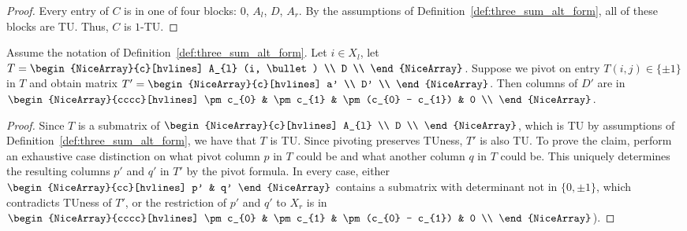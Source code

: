 \begin{proof}
    Every entry of $C$ is in one of four blocks: $0$, $A_{l}$, $D$, $A_{r}$. By the assumptions of Definition~\ref{def:three_sum_alt_form}, all of these blocks are TU. Thus, $C$ is $1$-TU.
\end{proof}

\begin{lemma}\label{lem:three_sum_alt_form_pivot}
    Assume the notation of Definition~\ref{def:three_sum_alt_form}. Let $i \in X_{l}$, let $T = \begin{NiceArray}{c}[hvlines] A_{l} (i, \bullet) \\ D \\ \end{NiceArray}$. Suppose we pivot on entry $T (i, j) \in \{\pm 1\}$ in $T$ and obtain matrix $T' = \begin{NiceArray}{c}[hvlines] a' \\ D' \\ \end{NiceArray}$. Then columns of $D'$ are in $\begin{NiceArray}{cccc}[hvlines] \pm c_{0} & \pm c_{1} & \pm (c_{0} - c_{1}) & 0 \\ \end{NiceArray}$.
\end{lemma}

\begin{proof}
    Since $T$ is a submatrix of $\begin{NiceArray}{c}[hvlines] A_{l} \\ D \\ \end{NiceArray}$, which is TU by assumptions of Definition~\ref{def:three_sum_alt_form}, we have that $T$ is TU. Since pivoting preserves TUness, $T'$ is also TU. To prove the claim, perform an exhaustive case distinction on what pivot column $p$ in $T$ could be and what another column $q$ in $T$ could be. This uniquely determines the resulting columns $p'$ and $q'$ in $T'$ by the pivot formula. In every case, either $\begin{NiceArray}{cc}[hvlines] p' & q' \end{NiceArray}$ contains a submatrix with determinant not in $\{0, \pm 1\}$, which contradicts TUness of $T'$, or the restriction of $p'$ and $q'$ to $X_{r}$ is in $\begin{NiceArray}{cccc}[hvlines] \pm c_{0} & \pm c_{1} & \pm (c_{0} - c_{1}) & 0 \\ \end{NiceArray}$).
\end{proof}

